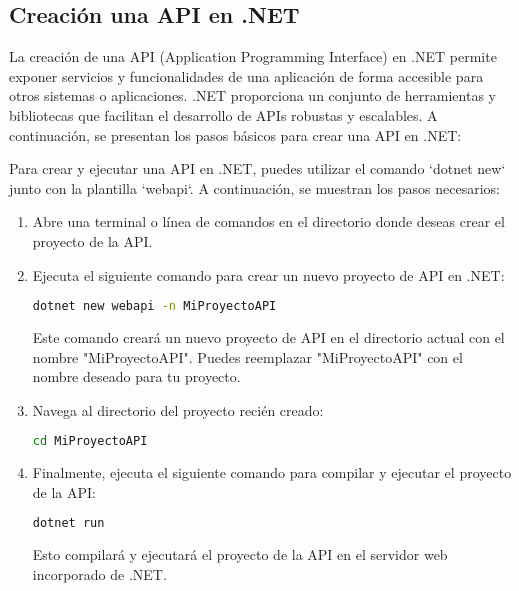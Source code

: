 \documentclass[executivepaper]{article}
\begin{document}
\subsection{Creación una API en .NET}

La creación de una API (Application Programming Interface) en .NET permite exponer servicios y funcionalidades de una aplicación de forma accesible para otros sistemas o aplicaciones. .NET proporciona un conjunto de herramientas y bibliotecas que facilitan el desarrollo de APIs robustas y escalables. A continuación, se presentan los pasos básicos para crear una API en .NET:

Para crear y ejecutar una API en .NET, puedes utilizar el comando `dotnet new` junto con la plantilla `webapi`. A continuación, se muestran los pasos necesarios:

\begin{enumerate}
  \item Abre una terminal o línea de comandos en el directorio donde deseas crear el proyecto de la API.

  \item Ejecuta el siguiente comando para crear un nuevo proyecto de API en .NET:

  \begin{lstlisting}[language=bash]
  dotnet new webapi -n MiProyectoAPI
\end{lstlisting}

  Este comando creará un nuevo proyecto de API en el directorio actual con el nombre "MiProyectoAPI". Puedes reemplazar "MiProyectoAPI" con el nombre deseado para tu proyecto.

  \item Navega al directorio del proyecto recién creado:

  \begin{lstlisting}[language=bash]
  cd MiProyectoAPI
\end{lstlisting}

  \item Finalmente, ejecuta el siguiente comando para compilar y ejecutar el proyecto de la API:

  \begin{lstlisting}[language=bash]
  dotnet run
\end{lstlisting}

  Esto compilará y ejecutará el proyecto de la API en el servidor web incorporado de .NET.

\end{enumerate}
\end{document}
